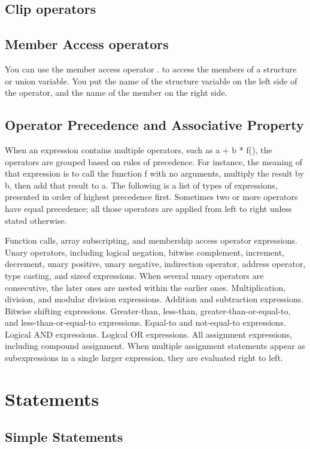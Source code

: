 \documentclass[12pt]{article}
\begin{document}
\subsection{Clip operators} %

\subsection{Member Access operators} %
You can use the member access operator . to access the members of a structure or union variable. You put the name of the structure variable on the left side of the operator, and the name of the member on the right side.

\subsection{Operator Precedence and Associative Property} %
When an expression contains multiple operators, such as a + b * f(), the operators are grouped based on rules of precedence. For instance, the meaning of that expression is to call the function f with no arguments, multiply the result by b, then add that result to a. 
The following is a list of types of expressions, presented in order of highest precedence first. Sometimes two or more operators have equal precedence; all those operators are applied from left to right unless stated otherwise.

Function calls, array subscripting, and membership access operator expressions.
Unary operators, including logical negation, bitwise complement, increment, decrement, unary positive, unary negative, indirection operator, address operator, type casting, and sizeof expressions. When several unary operators are consecutive, the later ones are nested within the earlier ones.
Multiplication, division, and modular division expressions.
Addition and subtraction expressions.
Bitwise shifting expressions.
Greater-than, less-than, greater-than-or-equal-to, and less-than-or-equal-to
expressions.
Equal-to and not-equal-to expressions.
Logical AND expressions.
Logical OR expressions.
All assignment expressions, including compound assignment. When multiple assignment statements appear as subexpressions in a single larger expression, they are evaluated right to left.

%
\section{Statements}
\subsection{Simple Statements} %
\end{document}
